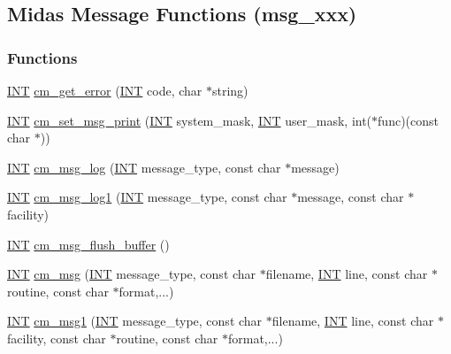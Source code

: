 \subsection{Midas Message Functions (msg\_\-xxx)}
\label{group__msgfunctionc}
\subsubsection*{Functions}
\begin{DoxyCompactItemize}
\item 
\hyperlink{vppg_8h_a392e62da233ed3e2f7c3fd4f487a3896}{INT} \hyperlink{group__msgfunctionc_ga42f4420ba3e5b4663f3fdd80a586841e}{cm\_\-get\_\-error} (\hyperlink{vppg_8h_a392e62da233ed3e2f7c3fd4f487a3896}{INT} code, char $\ast$string)
\item 
\hyperlink{vppg_8h_a392e62da233ed3e2f7c3fd4f487a3896}{INT} \hyperlink{group__msgfunctionc_gafe6ff62436845805cd87a7ea1bd3b4dd}{cm\_\-set\_\-msg\_\-print} (\hyperlink{vppg_8h_a392e62da233ed3e2f7c3fd4f487a3896}{INT} system\_\-mask, \hyperlink{vppg_8h_a392e62da233ed3e2f7c3fd4f487a3896}{INT} user\_\-mask, int($\ast$func)(const char $\ast$))
\item 
\hyperlink{vppg_8h_a392e62da233ed3e2f7c3fd4f487a3896}{INT} \hyperlink{group__msgfunctionc_gadac7f1f490117d6cdd4fc39bd7f9d0d5}{cm\_\-msg\_\-log} (\hyperlink{vppg_8h_a392e62da233ed3e2f7c3fd4f487a3896}{INT} message\_\-type, const char $\ast$message)
\item 
\hyperlink{vppg_8h_a392e62da233ed3e2f7c3fd4f487a3896}{INT} \hyperlink{group__msgfunctionc_gacc533051c0100cc554cd28314079e71c}{cm\_\-msg\_\-log1} (\hyperlink{vppg_8h_a392e62da233ed3e2f7c3fd4f487a3896}{INT} message\_\-type, const char $\ast$message, const char $\ast$facility)
\item 
\hyperlink{vppg_8h_a392e62da233ed3e2f7c3fd4f487a3896}{INT} \hyperlink{group__msgfunctionc_gaa28e2fd30622699b67e7b0116da2923c}{cm\_\-msg\_\-flush\_\-buffer} ()
\item 
\hyperlink{vppg_8h_a392e62da233ed3e2f7c3fd4f487a3896}{INT} \hyperlink{group__msgfunctionc_gaac032ca2438c47466bfc9722de6746ea}{cm\_\-msg} (\hyperlink{vppg_8h_a392e62da233ed3e2f7c3fd4f487a3896}{INT} message\_\-type, const char $\ast$filename, \hyperlink{vppg_8h_a392e62da233ed3e2f7c3fd4f487a3896}{INT} line, const char $\ast$routine, const char $\ast$format,...)
\item 
\hyperlink{vppg_8h_a392e62da233ed3e2f7c3fd4f487a3896}{INT} \hyperlink{group__msgfunctionc_ga2dcad358d4ad50963cf2f34c56201f62}{cm\_\-msg1} (\hyperlink{vppg_8h_a392e62da233ed3e2f7c3fd4f487a3896}{INT} message\_\-type, const char $\ast$filename, \hyperlink{vppg_8h_a392e62da233ed3e2f7c3fd4f487a3896}{INT} line, const char $\ast$facility, const char $\ast$routine, const char $\ast$format,...)

\end{DoxyCompactItemize}
